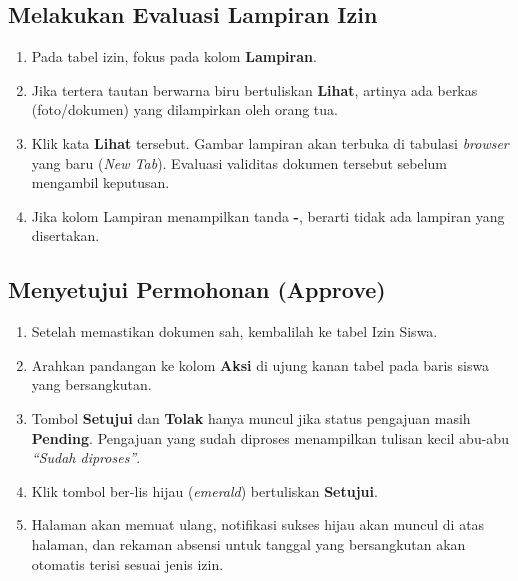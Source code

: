 \subsection{Melakukan Evaluasi Lampiran Izin}
\begin{enumerate}
    \item Pada tabel izin, fokus pada kolom \textbf{Lampiran}.
    \item Jika tertera tautan berwarna biru bertuliskan \textbf{Lihat}, artinya ada berkas (foto/dokumen) yang dilampirkan oleh orang tua.
    \item Klik kata \textbf{Lihat} tersebut. Gambar lampiran akan terbuka di tabulasi \textit{browser} yang baru (\textit{New Tab}). Evaluasi validitas dokumen tersebut sebelum mengambil keputusan.
    \item Jika kolom Lampiran menampilkan tanda \textbf{-}, berarti tidak ada lampiran yang disertakan.
\end{enumerate}

\subsection{Menyetujui Permohonan (Approve)}
\begin{enumerate}
    \item Setelah memastikan dokumen sah, kembalilah ke tabel Izin Siswa.
    \item Arahkan pandangan ke kolom \textbf{Aksi} di ujung kanan tabel pada baris siswa yang bersangkutan.
    \item Tombol \textbf{Setujui} dan \textbf{Tolak} hanya muncul jika status pengajuan masih \textbf{Pending}. Pengajuan yang sudah diproses menampilkan tulisan kecil abu-abu \textit{``Sudah diproses''}.
    \item Klik tombol ber-lis hijau (\textit{emerald}) bertuliskan \textbf{Setujui}.
    \item Halaman akan memuat ulang, notifikasi sukses hijau akan muncul di atas halaman, dan rekaman absensi untuk tanggal yang bersangkutan akan otomatis terisi sesuai jenis izin.
\end{enumerate}

